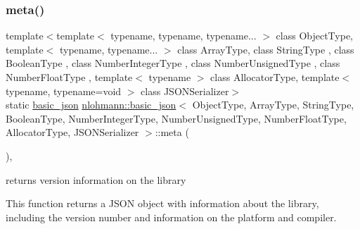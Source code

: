 \subsubsection{\texorpdfstring{meta()}{meta()}}
{\footnotesize\ttfamily template$<$template$<$ typename, typename, typename... $>$ class Object\+Type, template$<$ typename, typename... $>$ class Array\+Type, class String\+Type , class Boolean\+Type , class Number\+Integer\+Type , class Number\+Unsigned\+Type , class Number\+Float\+Type , template$<$ typename $>$ class Allocator\+Type, template$<$ typename, typename=void $>$ class J\+S\+O\+N\+Serializer$>$ \\
static \hyperlink{classnlohmann_1_1basic__json}{basic\+\_\+json} \hyperlink{classnlohmann_1_1basic__json}{nlohmann\+::basic\+\_\+json}$<$ Object\+Type, Array\+Type, String\+Type, Boolean\+Type, Number\+Integer\+Type, Number\+Unsigned\+Type, Number\+Float\+Type, Allocator\+Type, J\+S\+O\+N\+Serializer $>$\+::meta (\begin{DoxyParamCaption}{ }\end{DoxyParamCaption})\hspace{0.3cm}{\ttfamily [inline]}, {\ttfamily [static]}}



returns version information on the library 

This function returns a J\+S\+ON object with information about the library, including the version number and information on the platform and compiler.


